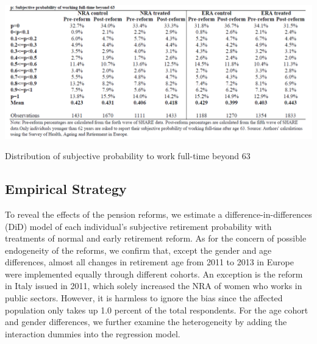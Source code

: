 \documentclass[a4paper]{article}
\begin{document}
\begin{table}[h] 
    \centering
    \includegraphics[width=1\linewidth]{table1.png}
    \caption{Distribution of subjective probability to work full-time beyond 63}
    \label{1}
\end{table}

\subsection{Empirical Strategy}

To reveal the effects of the pension reforms, we estimate a difference-in-differences (DiD) model of each individual’s subjective retirement probability with treatments of normal and early retirement reform. As for the concern of possible endogeneity of the reforms, we confirm that, except the gender and age differences, almost all changes in retirement age from 2011 to 2013 in Europe were implemented equally through different cohorts. An exception is the reform in Italy issued in 2011, which solely increased the NRA of women who works in public sectors. However, it is harmless to ignore the bias since the affected population only takes up 1.0 percent of the total respondents. For the age cohort and gender differences, we further examine the heterogeneity by adding the interaction dummies into the regression model.  
\end{document}
